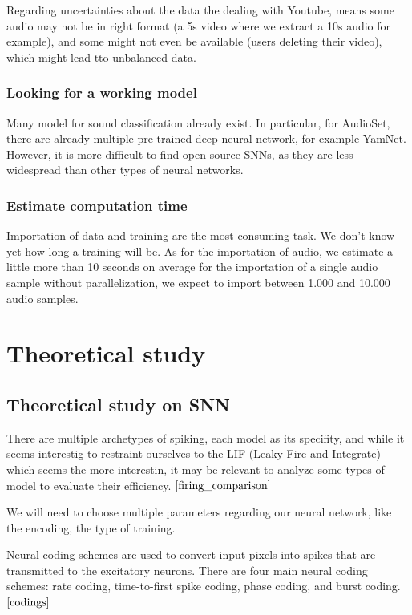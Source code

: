 \documentclass[11pt]{article}
\begin{document}
Regarding uncertainties about the data the dealing with Youtube, means some audio may not be in right format (a 5s video where we extract a 10s audio for example), and some might not even be available (users deleting their video), which might lead tto unbalanced data.


\subsubsection{Looking for a working model}

Many model for sound classification already exist. In particular, for AudioSet, there are already multiple pre-trained deep neural network, for example YamNet. However, it is more difficult to find open source SNNs, as they are less widespread than other types of neural networks.

\subsubsection{Estimate computation time}

Importation of data and training are the most consuming task. We don't know yet how long a training will be. As for the importation of audio, we estimate a little more than 10 seconds on average for the importation of a single audio sample without parallelization, we expect to import between 1.000 and 10.000 audio samples.


\section{Theoretical study}
\subsection{Theoretical study on SNN}

There are multiple archetypes of spiking, each model as its specifity, and while it seems interestig to restraint ourselves to the LIF (Leaky Fire and Integrate) which seems the more interestin, it may be relevant to analyze some types of model to evaluate their efficiency. ${\cite{firing_comparison}}$

We will need to choose multiple parameters regarding our neural network, like the encoding, the type of training.

Neural coding schemes are used to convert input pixels into spikes that are transmitted to the excitatory neurons. There are four main neural coding schemes: rate coding, time-to-first spike coding, phase coding, and burst coding.${\cite{codings}}$
\end{document}
